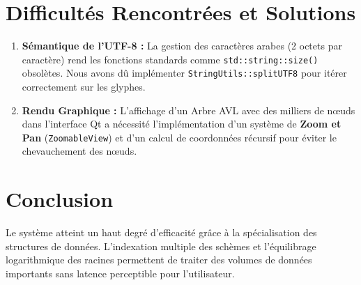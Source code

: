 \documentclass[12pt,a4paper]{article}
\begin{document}
\section{Difficultés Rencontrées et Solutions}
\begin{enumerate}
	\item \textbf{Sémantique de l'UTF-8 :} La gestion des caractères arabes (2 octets par caractère) rend les fonctions standards comme \texttt{std::string::size()} obsolètes. Nous avons dû implémenter \texttt{StringUtils::splitUTF8} pour itérer correctement sur les glyphes.
	\item \textbf{Rendu Graphique :} L'affichage d'un Arbre AVL avec des milliers de nœuds dans l'interface Qt a nécessité l'implémentation d'un système de \textbf{Zoom et Pan} (\texttt{ZoomableView}) et d'un calcul de coordonnées récursif pour éviter le chevauchement des nœuds.
\end{enumerate}

\section{Conclusion}
Le système atteint un haut degré d'efficacité grâce à la spécialisation des structures de données. L'indexation multiple des schèmes et l'équilibrage logarithmique des racines permettent de traiter des volumes de données importants sans latence perceptible pour l'utilisateur.
\end{document}
